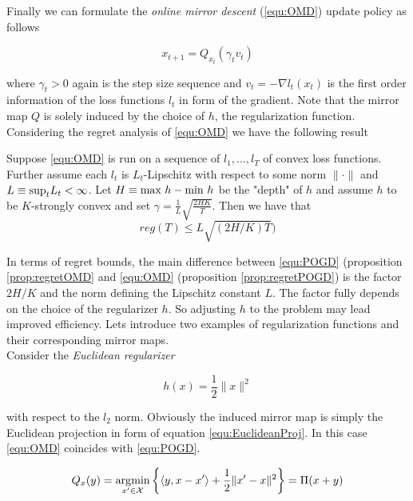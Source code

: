 Finally we can formulate the \textit{online mirror descent} (\ref{equ:OMD}) update policy as follows

\begin{equation*}
    \tag{OMD}
    x_{t+1} = Q_{x_t}(\gamma_t v_t)
    \label{equ:OMD}
\end{equation*}

where $\gamma_t > 0$ again is the step size sequence and $v_t = -\nabla l_t(x_t)$ is the first order information of the loss functions $l_t$ in form of the gradient. Note that the mirror map $Q$ is solely induced by the choice of $h$, the regularization function. Considering the regret analysis of \ref{equ:OMD} we have the following result \cite[Theorem 2.4]{HDRmertikopoulos}

\begin{proposition}\label{prop:regretOMD}
    Suppose \ref{equ:OMD} is run on a sequence of $l_1,\dots,l_T$ of convex loss functions. Further assume each $l_t$ is $L_t$-Lipschitz with respect to some norm $\|\cdot\|$ and $L \equiv \textnormal{sup}_t L_t < \infty$. Let $H \equiv \textnormal{max } h-\textnormal{min } h$ be the "depth" of $h$ and assume $h$ to be $K$-strongly convex and set $\gamma = \frac{1}{L}\sqrt{\frac{2HK}{T}}$. Then we have that
    \[reg(T) \le L\sqrt{(2H/K)T})\]
\end{proposition}

In terms of regret bounds, the main difference between \ref{equ:POGD} (proposition \ref{prop:regretOMD} and \ref{equ:OMD} (proposition \ref{prop:regretPOGD}) is the factor $2H/K$ and the norm defining the Lipschitz constant $L$. The factor fully depends on the choice of the regularizer $h$. So adjusting $h$ to the problem may lead improved efficiency. Lets introduce two examples of regularization functions and their corresponding mirror maps. \\

Consider the \textit{Euclidean regularizer}

\begin{equation*}
    h(x) = \frac{1}{2}\|x\|^2
\end{equation*}

with respect to the $l_2$ norm. Obviously the induced mirror map is simply the Euclidean projection in form of equation \ref{equ:EuclideanProj}. In this case \ref{equ:OMD} coincides with \ref{equ:POGD}. 

\begin{equation*}
    Q_x(y) = \operatorname*{\arg\!\min}_{x'\in \mathcal{X}}\bigg\{\langle y,x-x'\rangle + \frac{1}{2}\|x'-x\|^2\bigg\} = \Pi(x + y)
\end{equation*}

